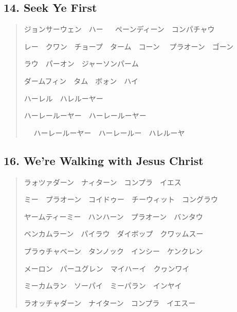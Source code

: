 \documentclass[a4paper, twocolumn]{article}
\begin{document}
\subsection*{14. Seek Ye First}

\begin{quote}
ジョンサーウェン　ハー 　
ペーンディーン　コンパチャウ\par
レー　クワン　チョープ　ターム　コーン　
プラオーン　ゴーン

\smallskip
ラウ　パーオン　ジャーソンパーム\par
ダームフィン　タム　ボォン　ハイ\par
ハーレル　ハレルーヤー\par
ハーレールーヤー　ハーレールーヤー\par　
ハーレールーヤー　ハーレールー　ハレルーヤ
\end{quote}






\subsection*{16. We're Walking with Jesus Christ}

\begin{quote}
ラォツァダーン　ナィターン　コンプラ　イエス\par
ミー　プラオーン　コイドゥー　チーウィット　コングラウ\par
ヤームティーミー　ハンハーン　プラオーン　バンタウ\par
ベンカムラーン　パイラウ　ダイボップ　クワッムスー\par
プラゥチャベーン　タンノック　インシー　ケンクレン\par
メーロン　パーユグレン　マイハーイ　クヮンワイ\par
ミーカムラン　ソーパイ　ミーパラン　インヤイ\par
ラオッチャダーン　ナイターン　コンプラ　イエスー
\end{quote}

\end{document}

